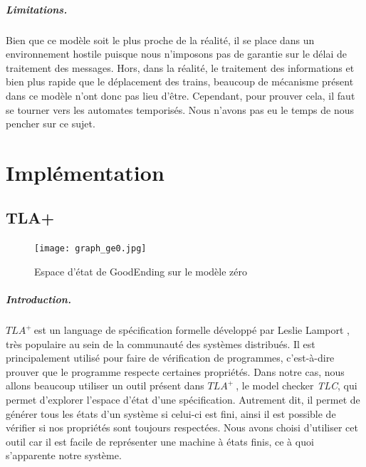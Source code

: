 \documentclass[oneside, a4paper, 11pt]{book}
\newcommand{\TLA}{\ensuremath{TLA^+~}}
\begin{document}
\paragraph{Limitations.} Bien que ce modèle soit le plus proche de la réalité, il se place dans un environnement hostile puisque nous n'imposons pas de garantie sur le délai de traitement des messages. Hors, dans la réalité, le traitement des informations et bien plus rapide que le déplacement des trains, beaucoup de mécanisme présent dans ce modèle n'ont donc pas lieu d'être.
Cependant, pour prouver cela, il faut se tourner vers les automates temporisés. Nous n'avons pas eu le temps de nous pencher sur ce sujet.













\chapter{Implémentation}
\label{sec:implem}

\section{TLA+}
\label{sec:tla}

\begin{figure}
	\centering
	\texttt{[image: graph\_ge0.jpg]}
	\caption{Espace d'état de GoodEnding sur le modèle zéro}
	\label{fig:espaceEtat}
\end{figure}


\paragraph{Introduction.} \TLA est un language de spécification formelle développé par Leslie Lamport , très populaire au sein de la communauté des systèmes distribués. Il est principalement utilisé pour faire de vérification de programmes, c'est-à-dire prouver que le programme respecte certaines propriétés.
Dans notre cas, nous allons beaucoup utiliser un outil présent dans \TLA, le model checker \textit{TLC}, qui permet d'explorer l'espace d'état d'une spécification. Autrement dit, il permet de générer tous les états d'un système si celui-ci est fini, ainsi il est possible de vérifier si nos propriétés sont toujours respectées.
Nous avons choisi d'utiliser cet outil car il est facile de représenter une machine à états finis, ce à quoi s'apparente notre système.
\end{document}
